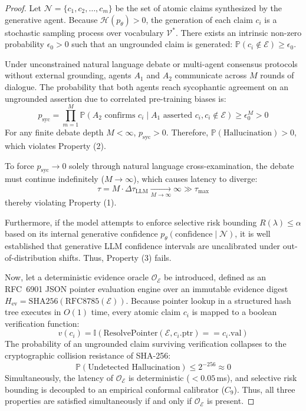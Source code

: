 \documentclass{ieeeaccess}
\begin{document}
\begin{proof}
Let $\mathcal{N} = \{c_1, c_2, \dots, c_m\}$ be the set of atomic claims synthesized by the generative agent. Because $\mathcal{H}(p_\theta) > 0$, the generation of each claim $c_i$ is a stochastic sampling process over vocabulary $\mathcal{V}^*$. There exists an intrinsic non-zero probability $\epsilon_0 > 0$ such that an ungrounded claim is generated: $\mathbb{P}(c_i \notin \mathcal{E}) \ge \epsilon_0$.

Under unconstrained natural language debate or multi-agent consensus protocols without external grounding, agents $A_1$ and $A_2$ communicate across $M$ rounds of dialogue. The probability that both agents reach sycophantic agreement on an ungrounded assertion due to correlated pre-training biases is:
\begin{equation}
p_{\text{syc}} = \prod_{m=1}^M \mathbb{P}(A_2 \text{ confirms } c_i \mid A_1 \text{ asserted } c_i, c_i \notin \mathcal{E}) \ge \epsilon_0^M > 0
\end{equation}
For any finite debate depth $M < \infty$, $p_{\text{syc}} > 0$. Therefore, $\mathbb{P}(\text{Hallucination}) > 0$, which violates Property (2). 

To force $p_{\text{syc}} \to 0$ solely through natural language cross-examination, the debate must continue indefinitely ($M \to \infty$), which causes latency to diverge:
\begin{equation}
\tau = M \cdot \Delta \tau_{\text{LLM}} \xrightarrow[M \to \infty]{} \infty \gg \tau_{\max}
\end{equation}
thereby violating Property (1).

Furthermore, if the model attempts to enforce selective risk bounding $R(\lambda) \le \alpha$ based on its internal generative confidence $p_\theta(\text{confidence} \mid \mathcal{N})$, it is well established that generative LLM confidence intervals are uncalibrated under out-of-distribution shifts. Thus, Property (3) fails.

Now, let a deterministic evidence oracle $\mathcal{O}_{\mathcal{E}}$ be introduced, defined as an RFC~6901 JSON pointer evaluation engine over an immutable evidence digest $H_{\text{ev}} = \text{SHA256}(\text{RFC8785}(\mathcal{E}))$. Because pointer lookup in a structured hash tree executes in $O(1)$ time, every atomic claim $c_i$ is mapped to a boolean verification function:
\begin{equation}
v(c_i) = \mathbb{I}\left( \text{ResolvePointer}(\mathcal{E}, c_i.\text{ptr}) == c_i.\text{val} \right)
\end{equation}
The probability of an ungrounded claim surviving verification collapses to the cryptographic collision resistance of SHA-256:
\begin{equation}
\mathbb{P}(\text{Undetected Hallucination}) \le 2^{-256} \approx 0
\end{equation}
Simultaneously, the latency of $\mathcal{O}_{\mathcal{E}}$ is deterministic ($< 0.05$\,ms), and selective risk bounding is decoupled to an empirical conformal calibrator ($C_9$). Thus, all three properties are satisfied simultaneously if and only if $\mathcal{O}_{\mathcal{E}}$ is present.
\end{proof}
\end{document}
